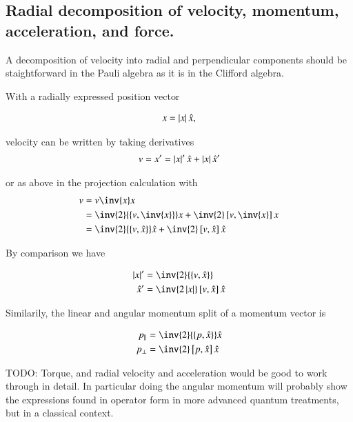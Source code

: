 \documentclass{article}
\newcommand{\symmetric}[2]{{\left\{{#1},{#2}\right\}}}
\newcommand{\antisymmetric}[2]{\left[{#1},{#2}\right]}
\newcommand{\xhat}[0]{\hat{x}}
\begin{document}
\subsection{ Radial decomposition of velocity, momentum, acceleration, and force. }

A decomposition of velocity into radial and perpendicular components should be staightforward in the Pauli
algebra as it is in the Clifford algebra.

With a radially expressed position vector

\begin{align*}
x = \Abs{x} \xhat,
\end{align*}

velocity can be written by taking derivatives
\begin{align*}
v = x' = \Abs{x}' \xhat + \Abs{x} \xhat'
\end{align*}

or as above in the projection calculation with
\begin{align*}
v
&= v \inv{x} x \\
&= \inv{2}\symmetric{v}{\inv{x}} x + \inv{2}\antisymmetric{v}{\inv{x}} x \\
&= \inv{2}\symmetric{v}{\xhat} \xhat + \inv{2}\antisymmetric{v}{\xhat} \xhat
\end{align*}

By comparison we have

\begin{align*}
\Abs{x}' &= \inv{2}\symmetric{v}{\xhat} \\
\xhat' &= \inv{2 \Abs{x}} \antisymmetric{v}{\xhat} \xhat
\end{align*}

Similarily, the linear and angular momentum split of a momentum vector is

\begin{align*}
p_\parallel &= \inv{2}\symmetric{p}{\xhat} \xhat \\
p_\perp &= \inv{2}\antisymmetric{p}{\xhat} \xhat
\end{align*}

TODO: Torque, and radial velocity and acceleration would be good to work through in detail.  In particular doing the
angular momentum will probably show the expressions found in operator form in more advanced quantum treatments, but
in a classical context.



\end{document}
